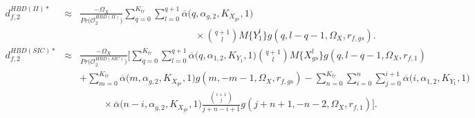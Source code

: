 \begin{proposition}
\begin{figure}[!t]
\normalsize
\setcounter{mytempeqncnt}{\value{equation}}
\setcounter{equation}{21}
\begin{eqnarray}
d_{f,2}^{HBD(II)*} & \approx & \frac{-\Omega_X}{Pr\big(\mathcal{O}_{2}^{HBD(II)}\big)} \sum_{q=0}^{K_{tr}} \sum_{l=0}^{q+1} \overline{\alpha}\big(q,\alpha_{g,2}, K_{X_{gs}}, 1\big) \nonumber \\
 & & \hspace{5cm} \times \binom{q+1}{l} M\{Y_1^l\} g(q,l-q-1,\Omega_X,r_{f,gs}). \label{JD_HBD_UCS_df_var_UAV2_II} \\
d_{f,2}^{HBD(SIC)*} & \approx & \frac{-\Omega_X}{Pr\big(\mathcal{O}_{2}^{HBD(SIC)}\big)} \Bigg[ \sum_{q=0}^{K_{tr}}\sum_{l=0}^{q+1} \overline{\alpha}\big(q,\alpha_{1,2},K_{Y_{1}},1\big) \binom{q+1}{l} M\{X_{gs}^l\} g(q,l-q-1,\Omega_X,r_{f,1}) \nonumber \\
 & & + \sum_{m=0}^{K_{tr}} \overline{\alpha}\big(m,\alpha_{g,2},K_{X_{gs}},1\big) g(m,-m-1,\Omega_X,r_{f,gs}) - \sum_{n=0}^{K_{tr}}\sum_{i=0}^{n}\sum_{j=0}^{i+1} \overline{\alpha}\big(i,\alpha_{1,2},K_{Y_{1}},1\big) \nonumber\\
 & & \hspace{1cm} \times \overline{\alpha}\big(n-i,\alpha_{g,2},K_{X_{gs}},1\big) \frac{\binom{i+1}{j}}{j+n-i+1} g(j+n+1,-n-2,\Omega_X,r_{f,1}) \Bigg]. \label{JD_HBD_UCS_df_var_UAV2_SIC}
\end{eqnarray}
\setcounter{equation}{\value{mytempeqncnt}}
\addtocounter{equation}{2}
\hrulefill
\vspace*{4pt}
\end{figure}
\begin{figure}[!t]
\normalsize
\setcounter{mytempeqncnt}{\value{equation}}
\setcounter{equation}{23}
\begin{eqnarray}

\end{eqnarray}
\end{figure}
\end{proposition}
